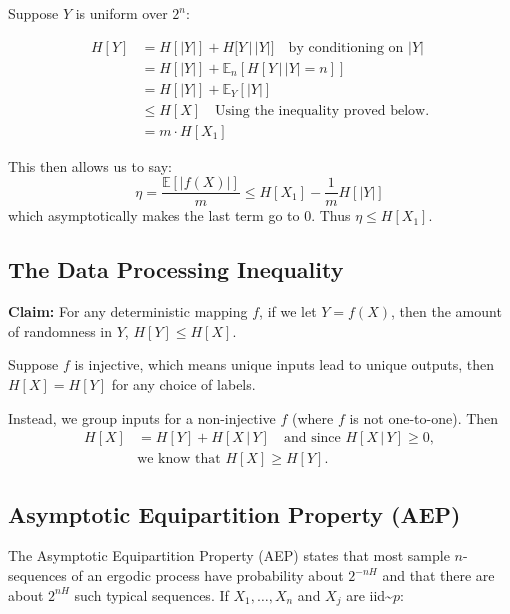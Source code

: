 Suppose \( Y \) is uniform over \( 2^n \):

\begin{align*}
    H[Y] &= H[|Y|] + H[Y \,|\, |Y|] \quad \text{by conditioning on } |Y| \\
         &= H[|Y|] + \mathbb{E}_n[H[Y \,|\, |Y|=n]] \\
         &= H[|Y|] + \mathbb{E}_Y[|Y|] \\
         &\leq H[X] \quad \text{Using the inequality proved below.} \\
         &= m \cdot H[X_1]
\end{align*}

This then allows us to say:
\begin{equation*}
    \eta = \frac{\mathbb{E}[|f(X)|]}{m} \leq H[X_1] - \frac{1}{m} H[|Y|]
\end{equation*}
which asymptotically makes the last term go to \( 0 \). Thus \( \eta \leq H[X_1] \).

\subsection{The Data Processing Inequality}

\textbf{Claim:} For any deterministic mapping \( f \), if we let \( Y = f(X) \), then the amount of randomness in \( Y \), \( H[Y] \leq H[X] \).

Suppose \( f \) is injective, which means unique inputs lead to unique outputs, then \( H[X] = H[Y] \) for any choice of labels.

Instead, we group inputs for a non-injective \( f \) (where \( f \) is not one-to-one). Then
\begin{align*}
    H[X] &= H[Y] + H[X \,|\, Y] \quad \text{and since } H[X \,|\, Y] \geq 0, \\
    &\text{we know that } H[X] \geq H[Y].
\end{align*}

\hrulefill

\subsection{Asymptotic Equipartition Property (AEP)}

The Asymptotic Equipartition Property (AEP) states that most sample \( n \)-sequences of an ergodic process have probability about \( 2^{-nH} \) and that there are about \( 2^{nH} \) such typical sequences. If \( X_1, \ldots, X_n \) and \( X_j \) are iid\textasciitilde \( p \):


